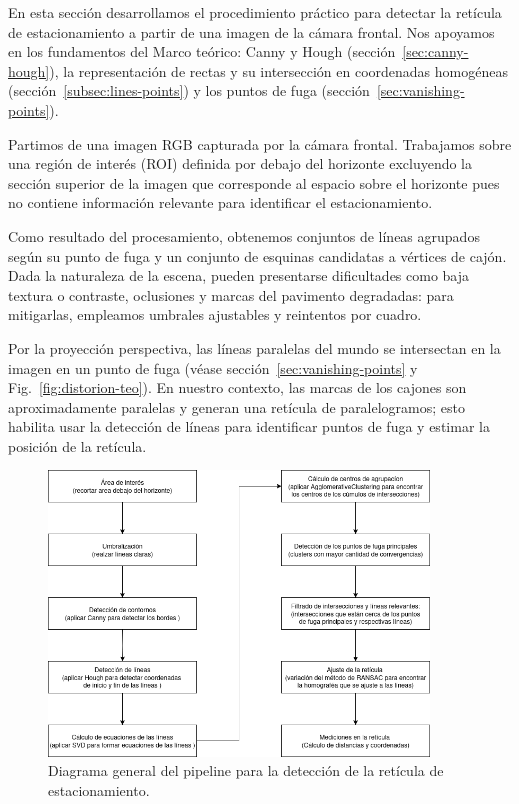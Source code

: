 
En esta sección desarrollamos el procedimiento práctico para detectar la
retícula de estacionamiento a partir de una imagen de la cámara frontal.
Nos apoyamos en los fundamentos del Marco teórico: Canny y Hough (sección~\ref{sec:canny-hough}), la representación de rectas y su intersección en coordenadas homogéneas (sección~\ref{subsec:lines-points}) y los puntos de fuga (sección~\ref{sec:vanishing-points}).

Partimos de una imagen RGB capturada por la cámara frontal. Trabajamos sobre una región de interés (ROI) definida por debajo del horizonte excluyendo la sección superior de la imagen que corresponde al espacio sobre el horizonte pues no contiene información relevante para identificar el estacionamiento.

Como resultado del procesamiento, obtenemos conjuntos de líneas agrupados según su punto de fuga y un conjunto de esquinas candidatas a vértices de cajón. Dada la naturaleza de la escena, pueden presentarse dificultades como baja textura o contraste, oclusiones y marcas del pavimento degradadas: para mitigarlas, empleamos umbrales ajustables y reintentos por cuadro.


Por la proyección perspectiva, las líneas paralelas del mundo se intersectan en la imagen en un punto de fuga
(véase sección~\ref{sec:vanishing-points} y Fig.~\ref{fig:distorion-teo}).
En nuestro contexto, las marcas de los cajones son aproximadamente paralelas y generan
una retícula de paralelogramos; esto habilita usar la detección de líneas para identificar puntos de fuga
y estimar la posición de la retícula.


\begin{figure}[!ht]
    \centering
    \includegraphics[width=0.9\textwidth]{img/3-metodo/piperline-reticule1.png}
    \caption{Diagrama general del pipeline para la detección de la retícula de estacionamiento.}
    \label{fig:reticula-pipeline}
\end{figure}


